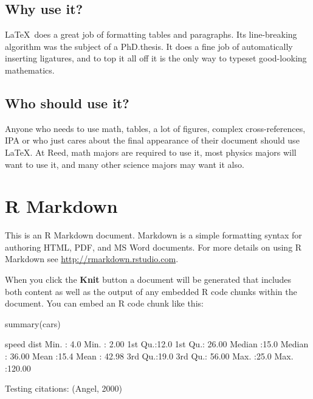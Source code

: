 \documentclass[12pt,twoside]{reedthesis}
\begin{document}
  \section{Why use it?}
  
  \LaTeX~does a great job of formatting tables and paragraphs. Its
  line-breaking algorithm was the subject of a PhD.\thinspace thesis. It
  does a fine job of automatically inserting ligatures, and to top it all
  off it is the only way to typeset good-looking mathematics.
  
  \section{Who should use it?}
  
  Anyone who needs to use math, tables, a lot of figures, complex
  cross-references, IPA or who just cares about the final appearance of
  their document should use \LaTeX. At Reed, math majors are required to
  use it, most physics majors will want to use it, and many other science
  majors may want it also.
  
  \chapter{R Markdown}
  
  This is an R Markdown document. Markdown is a simple formatting syntax
  for authoring HTML, PDF, and MS Word documents. For more details on
  using R Markdown see \url{http://rmarkdown.rstudio.com}.
  
  When you click the \textbf{Knit} button a document will be generated
  that includes both content as well as the output of any embedded R code
  chunks within the document. You can embed an R code chunk like this:
  
  \begin{CodeChunk}
  \begin{CodeInput}
  summary(cars)
  \end{CodeInput}
  \begin{CodeOutput}
       speed           dist       
   Min.   : 4.0   Min.   :  2.00  
   1st Qu.:12.0   1st Qu.: 26.00  
   Median :15.0   Median : 36.00  
   Mean   :15.4   Mean   : 42.98  
   3rd Qu.:19.0   3rd Qu.: 56.00  
   Max.   :25.0   Max.   :120.00  
  \end{CodeOutput}
  \end{CodeChunk}
  
  Testing citations: (Angel, 2000)
  
\end{document}
